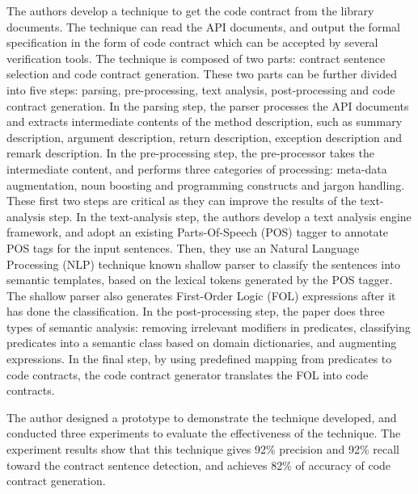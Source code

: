 \documentclass[11pt,letterpaper,oneside]{article}
\begin{document}
The authors develop a technique to get the code contract from the library documents.
The technique can read the API documents,
and output the formal specification in the form of code contract which can be accepted by several verification tools.
The technique is composed of two parts: contract sentence selection and code contract generation.
These two parts can be further divided into five steps: parsing, pre-processing, text analysis, post-processing and code contract generation.
In the parsing step, the parser processes the API documents and extracts intermediate contents of the method description, 
such as summary description, argument description, return description, exception description and remark description. 
In the pre-processing step, the pre-processor takes the intermediate content, 
and performs three categories of processing: meta-data augmentation, noun boosting and programming constructs and jargon handling.
These first two steps are critical as they can improve the results of the text-analysis step.
In the text-analysis step, the authors develop a text analysis engine framework, 
and adopt an existing Parts-Of-Speech (POS) tagger to annotate POS tags for the input sentences.
Then, they use an Natural Language Processing (NLP) technique known shallow parser to classify the sentences into semantic templates,
based on the lexical tokens generated by the POS tagger.
The shallow parser also generates First-Order Logic (FOL) expressions after it has done the classification.
In the post-processing step, the paper does three types of semantic analysis: removing irrelevant modifiers in predicates, classifying predicates into a semantic class based on domain dictionaries, and augmenting expressions.
In the final step, by using predefined mapping from predicates to code contracts,
the code contract generator translates the FOL into code contracts.

The author designed a prototype to demonstrate the technique developed,
and conducted three experiments to evaluate the effectiveness of the technique. 
The experiment results show that this technique gives 92\% precision and 92\% recall toward the contract sentence detection,
and achieves 82\% of accuracy of code contract generation.



\end{document}
